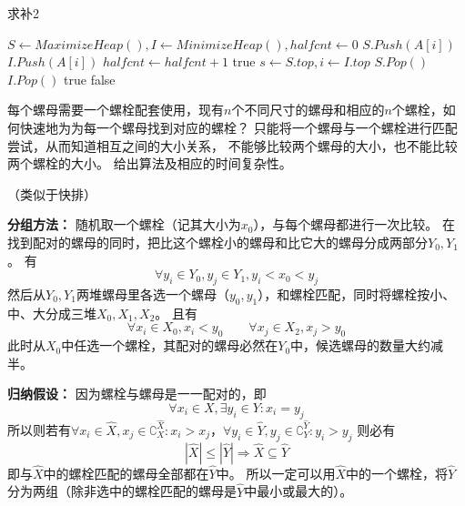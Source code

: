 \begin{questions}
    \begin{algorithm}[!htp]
        \caption{求补2}\label{0330:Composite2}
        \begin{algorithmic}[1]
            \State $S \gets MaximizeHeap(), I \gets MinimizeHeap(), halfcnt \gets 0$
             
            \State $S.Push(A[i])$
            \State $I.Push(A[i])$
            \Else {}
            \State $halfcnt \gets halfcnt + 1$
            \EndIf
            \EndFor
             
            \State \Return \textsf{true}
            \EndIf
             
            \State $s \gets S.top, i \gets I.top$ 
            \State $S.Pop()$
            \State $I.Pop()$
            \Else {}
            \State \Return \textsf{true}
            \EndIf
            \EndWhile
            \State \Return \textsf{false}
        \end{algorithmic}
    \end{algorithm}

    \question 每个螺母需要一个螺栓配套使用，现有$n$个不同尺寸的螺母和相应的$n$个螺栓，如何快速地为为每一个螺母找到对应的螺栓？
    只能将一个螺母与一个螺栓进行匹配尝试，从而知道相互之间的大小关系，
    不能够比较两个螺母的大小，也不能比较两个螺栓的大小。
    给出算法及相应的时间复杂性。
    \begin{solution}
        （类似于快排）

        \textbf{分组方法：}
        随机取一个螺栓（记其大小为$x_0$），与每个螺母都进行一次比较。
        在找到配对的螺母的同时，把比这个螺栓小的螺母和比它大的螺母分成两部分$Y_0, Y_1$。
        有\[
            \forall y_i \in Y_0, y_j \in Y_1,  y_i < x_0 < y_j
        \]
        然后从$Y_0, Y_1$两堆螺母里各选一个螺母（$y_0, y_1$），和螺栓匹配，同时将螺栓按小、中、大分成三堆$X_0, X_1, X_2$。
        且有\[
            \forall x_i \in X_0, x_i < y_0  \quad\quad \forall x_j \in X_2, x_j > y_0
        \]
        此时从$X_0$中任选一个螺栓，其配对的螺母必然在$Y_0$中，候选螺母的数量大约减半。

        \textbf{归纳假设：}
        因为螺栓与螺母是一一配对的，即\[ \forall x_i \in X, \exists y_i \in Y : x_i = y_j \]
        所以则若有$
            \forall x_i \in \hat{X}, x_j \in \complement_X^{\hat{X}} : x_i > x_j
        $，$
            \forall y_i \in \hat{Y}, y_j \in \complement_Y^{\hat{Y}} : y_i > y_j
        $
        则必有\[
            \left| \hat{X} \right| \le \left| \hat{Y} \right| \Rightarrow \hat{X} \subseteq \hat{Y}
        \]
        即与$\hat{X}$中的螺栓匹配的螺母全部都在$\hat{Y}$中。
        所以一定可以用$\hat{X}$中的一个螺栓，将$\hat{Y}$分为两组（除非选中的螺栓匹配的螺母是$\hat{Y}$中最小或最大的）。


\end{solution}
\end{questions}
